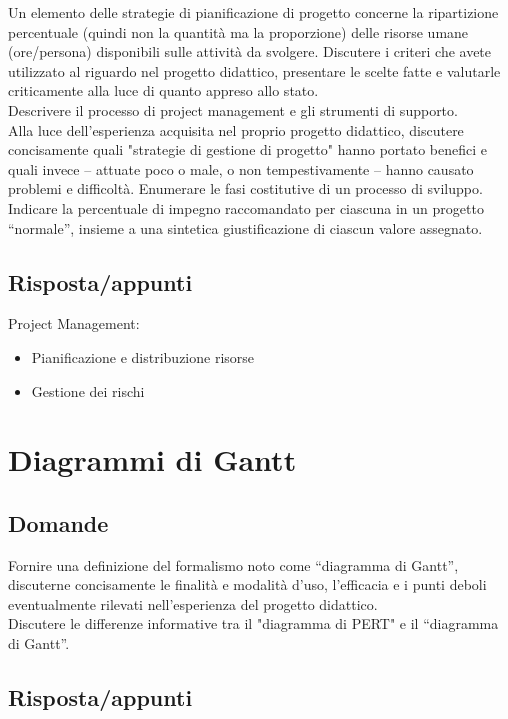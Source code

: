 Un elemento delle strategie di pianificazione di progetto concerne la ripartizione percentuale (quindi non la quantità ma la proporzione) delle risorse umane (ore/persona) disponibili sulle attività da svolgere.
Discutere i criteri che avete utilizzato al riguardo nel progetto didattico, presentare le scelte fatte e valutarle criticamente alla luce di quanto appreso allo stato. \\

Descrivere il processo di project management e gli strumenti di supporto. \\

Alla luce dell'esperienza acquisita nel proprio progetto didattico, discutere concisamente quali "strategie di gestione di progetto" hanno portato benefici e quali invece – attuate poco o male, o non tempestivamente – hanno causato problemi e difficoltà.
Enumerare le fasi costitutive di un processo di sviluppo.
Indicare la percentuale di impegno raccomandato per ciascuna in un progetto “normale”, insieme a una sintetica giustificazione di ciascun valore assegnato.

\subsection*{Risposta/appunti}
Project Management:
\begin{itemize}
\item Pianificazione e distribuzione risorse
\item Gestione dei rischi    
\end{itemize}

\section{Diagrammi di Gantt}

\subsection*{Domande}
Fornire una definizione del formalismo noto come “diagramma di Gantt”, discuterne concisamente le finalità e modalità d'uso, l'efficacia e i punti deboli eventualmente rilevati nell'esperienza del progetto didattico.\\

Discutere le differenze informative tra il "diagramma di PERT" e il “diagramma di Gantt”.

\subsection*{Risposta/appunti}

